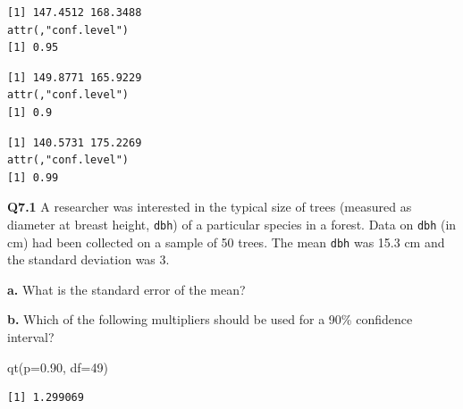 \documentclass[
  oneside]{krantz}
\newenvironment{Shaded}{\begin{snugshade}}{\end{snugshade}}
\newcommand{\AttributeTok}[1]{\textcolor[rgb]{0.77,0.63,0.00}{#1}}
\newcommand{\CommentTok}[1]{\textcolor[rgb]{0.56,0.35,0.01}{\textit{#1}}}
\newcommand{\DecValTok}[1]{\textcolor[rgb]{0.00,0.00,0.81}{#1}}
\newcommand{\FloatTok}[1]{\textcolor[rgb]{0.00,0.00,0.81}{#1}}
\newcommand{\FunctionTok}[1]{\textcolor[rgb]{0.00,0.00,0.00}{#1}}
\newcommand{\NormalTok}[1]{#1}
\newcommand{\SpecialCharTok}[1]{\textcolor[rgb]{0.00,0.00,0.00}{#1}}
\begin{document}
\begin{verbatim}
[1] 147.4512 168.3488
attr(,"conf.level")
[1] 0.95
\end{verbatim}

\begin{Shaded}
\end{Shaded}

\begin{verbatim}
[1] 149.8771 165.9229
attr(,"conf.level")
[1] 0.9
\end{verbatim}

\begin{Shaded}
\end{Shaded}

\begin{verbatim}
[1] 140.5731 175.2269
attr(,"conf.level")
[1] 0.99
\end{verbatim}

\textbf{Q7.1} A researcher was interested in the typical size of trees (measured as diameter at breast height, \texttt{dbh}) of a particular species in a forest. Data on \texttt{dbh} (in cm) had been collected on a sample of 50 trees. The mean \texttt{dbh} was 15.3 cm and the standard deviation was 3.

\textbf{a.} What is the standard error of the mean?

\textbf{b.} Which of the following multipliers should be used for a 90\% confidence interval?

\begin{Shaded}
\begin{Highlighting}[]
\FunctionTok{qt}\NormalTok{(}\AttributeTok{p=}\FloatTok{0.90}\NormalTok{, }\AttributeTok{df=}\DecValTok{49}\NormalTok{)}
\end{Highlighting}
\end{Shaded}

\begin{verbatim}
[1] 1.299069
\end{verbatim}
\end{document}

